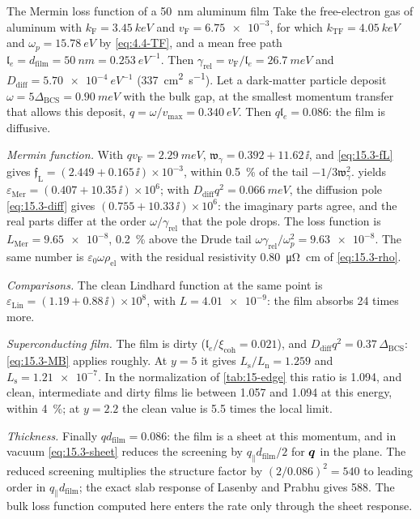 \begin{workedexample}{The Mermin loss function of a \SI{50}{nm} aluminum film}\label{we:15-film}
Take the free-electron gas of aluminum with $k_{\mathrm{F}} = \SI{3.45}{keV}$ and $v_{\mathrm{F}} = \num{6.75e-3}$, for which $k_{\mathrm{TF}} = \SI{4.05}{keV}$ and $\omega_p = \SI{15.78}{eV}$ by \cref{eq:4.4-TF}, and a mean free path $\mathfrak{l}_e = d_{\mathrm{film}} = \SI{50}{nm} = \SI{0.253}{eV^{-1}}$. Then $\gamma_{\mathrm{rel}} = v_{\mathrm{F}}/\mathfrak{l}_e = \SI{26.7}{meV}$ and $D_{\mathrm{diff}} = \SI{5.70e-4}{eV^{-1}}$ (\SI{337}{cm^2.s^{-1}}). Let a dark-matter particle deposit $\omega = 5\Delta_{\mathrm{BCS}} = \SI{0.90}{meV}$ with the bulk gap, at the smallest momentum transfer that allows this deposit, $q = \omega/v_{\mathrm{max}} = \SI{0.340}{eV}$. Then $q\mathfrak{l}_e = 0.086$: the film is diffusive.

\emph{Mermin function.} With $qv_{\mathrm{F}} = \SI{2.29}{meV}$, $\mathfrak{w}_\gamma = 0.392 + 11.62\,\ii$, and \cref{eq:15.3-fL} gives $\mathfrak{f}_{\mathrm{L}} = (2.449 + 0.165\,\ii)\times10^{-3}$, within \SI{0.5}{\percent} of the tail $-1/3\mathfrak{w}_\gamma^2$.  yields $\varepsilon_{\mathrm{Mer}} = (0.407 + 10.35\,\ii)\times10^{6}$; with $D_{\mathrm{diff}}q^2 = \SI{0.066}{meV}$, the diffusion pole \cref{eq:15.3-diff} gives $(0.755 + 10.33\,\ii)\times10^{6}$: the imaginary parts agree, and the real parts differ at the order $\omega/\gamma_{\mathrm{rel}}$ that the pole drops. The loss function is $L_{\mathrm{Mer}} = \num{9.65e-8}$, \SI{0.2}{\percent} above the Drude tail $\omega\gamma_{\mathrm{rel}}/\omega_p^2 = \num{9.63e-8}$. The same number is $\varepsilon_0\omega\rho_{\mathrm{el}}$ with the residual resistivity \SI{0.80}{\micro\ohm.cm} of \cref{eq:15.3-rho}.

\emph{Comparisons.} The clean Lindhard function at the same point is $\varepsilon_{\mathrm{Lin}} = (1.19 + 0.88\,\ii)\times10^8$, with $L = \num{4.01e-9}$: the film absorbs 24 times more.

\emph{Superconducting film.} The film is dirty ($\mathfrak{l}_e/\xi_{\mathrm{coh}} = 0.021$), and $D_{\mathrm{diff}}q^2 = 0.37\,\Delta_{\mathrm{BCS}}$: \cref{eq:15.3-MB} applies roughly. At $y = 5$ it gives $L_{\mathrm{s}}/L_{\mathrm{n}} = 1.259$ and $L_{\mathrm{s}} = \num{1.21e-7}$. In the normalization of \cref{tab:15-edge} this ratio is 1.094, and clean, intermediate and dirty films lie between 1.057 and 1.094 at this energy, within \SI{4}{\percent}; at $y = 2.2$ the clean value is 5.5 times the local limit.

\emph{Thickness.} Finally $qd_{\mathrm{film}} = 0.086$: the film is a sheet at this momentum, and in vacuum \cref{eq:15.3-sheet} reduces the screening by $q_\parallel d_{\mathrm{film}}/2$ for $\bm{q}$ in the plane. The reduced screening multiplies the structure factor by $(2/0.086)^2 = 540$ to leading order in $q_\parallel d_{\mathrm{film}}$; the exact slab response of Lasenby and Prabhu gives 588. The bulk loss function computed here enters the rate only through the sheet response.
\end{workedexample}

